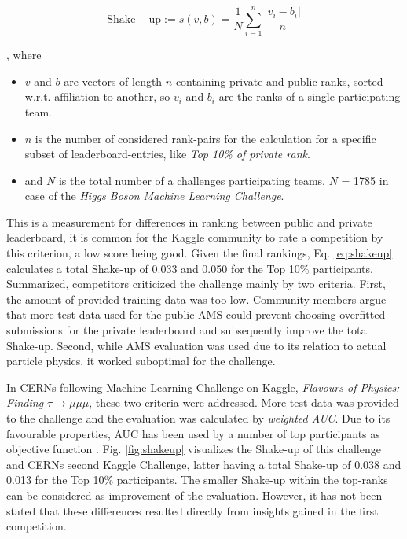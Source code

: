 \begin{equation}\label{eq:shakeup}
	\mathrm{Shake-up}:= s(v,b)= \frac{1}{N} \sum\limits_{i=1}^n \frac{|v_i-b_i|}{n}
\end{equation}

, where \begin{itemize}
	\item $v$ and $b$ are vectors of length $n$ containing private and public ranks, sorted w.r.t. affiliation to another, so $v_i$ and $b_i$ are the ranks of a single participating team.
	\item $n$ is the number of considered rank-pairs for the calculation for a specific subset of leaderboard-entries, like \emph{Top 10\% of private rank}.
	\item and $N$ is the total number of a challenges participating teams. $N$ = 1785 in case of the \emph{Higgs Boson Machine Learning Challenge}.
\end{itemize}

This is a measurement for differences in ranking between public and private leaderboard, it is common for the Kaggle community to rate a competition by this criterion, a low score being good. Given the final rankings, Eq. \eqref{eq:shakeup} calculates a total Shake-up of 0.033 and 0.050 for the Top 10\% participants. Summarized, competitors criticized the challenge mainly by two criteria. First, the amount of provided training data was too low. Community members argue that more test data used for the public AMS could prevent choosing overfitted submissions for the private leaderboard and subsequently improve the total Shake-up\cite{kaggleForum1,kaggleForum2}. Second, while AMS evaluation was used due to its relation to actual particle physics, it worked suboptimal for the challenge.

In CERNs following Machine Learning Challenge on Kaggle, \emph{Flavours of Physics: Finding $\tau \rightarrow \mu\mu\mu$}, these two criteria were addressed. More test data was provided to the challenge and the evaluation was calculated by \emph{weighted AUC}. Due to its favourable properties, AUC has been used by a number of top participants as objective function \cite{diaz14}. Fig. \ref{fig:shakeup} visualizes the Shake-up of this challenge and CERNs second Kaggle Challenge, latter having a total Shake-up of 0.038 and 0.013 for the Top 10\% participants. The smaller Shake-up within the top-ranks can be considered as improvement of the evaluation.
However, it has not been stated that these differences resulted directly from insights gained in the first competition.


